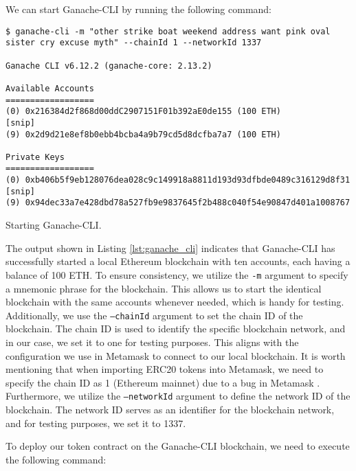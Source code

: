 We can start Ganache-CLI by running the following command:

\begin{listing}[!ht]
    \begin{verbatim}
$ ganache-cli -m "other strike boat weekend address want pink oval sister cry excuse myth" --chainId 1 --networkId 1337 

Ganache CLI v6.12.2 (ganache-core: 2.13.2)

Available Accounts
==================
(0) 0x216384d2f868d00ddC2907151F01b392aE0de155 (100 ETH)
[snip]
(9) 0x2d9d21e8ef8b0ebb4bcba4a9b79cd5d8dcfba7a7 (100 ETH)

Private Keys
==================
(0) 0xb406b5f9eb128076dea028c9c149918a8811d193d93dfbde0489c316129d8f31
[snip]
(9) 0x94dec33a7e428dbd78a527fb9e9837645f2b488c040f54e90847d401a1008767
    \end{verbatim}
    \caption{Starting Ganache-CLI.}
    \label{lst:ganache_cli}
\end{listing}

The output shown in Listing \ref{lst:ganache_cli} indicates that Ganache-CLI has successfully started a local Ethereum blockchain with ten accounts, each having a balance of 100 ETH. To ensure consistency, we utilize the \texttt{-m} argument to specify a mnemonic phrase for the blockchain. This allows us to start the identical blockchain with the same accounts whenever needed, which is handy for testing.
Additionally, we use the \texttt{--chainId} argument to set the chain ID of the blockchain. The chain ID is used to identify the specific blockchain network, and in our case, we set it to one for testing purposes. This aligns with the configuration we use in Metamask \cite{metamask} to connect to our local blockchain. It is worth mentioning that when importing ERC20 tokens into Metamask, we need to specify the chain ID as 1 (Ethereum mainnet) due to a bug in Metamask \cite{metamask_bug_importerc20}.
Furthermore, we utilize the \texttt{--networkId} argument to define the network ID of the blockchain. The network ID serves as an identifier for the blockchain network, and for testing purposes, we set it to 1337.

To deploy our token contract on the Ganache-CLI blockchain, we need to execute the following command:

